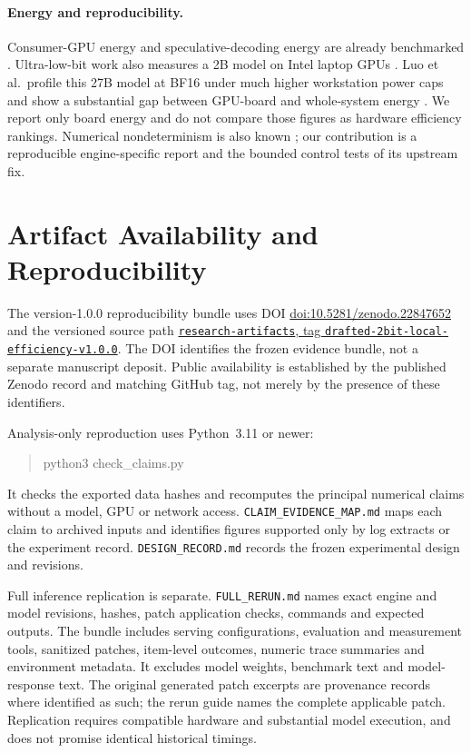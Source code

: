 \documentclass[11pt]{article}
\newcommand{\q}[1]{\texttt{#1}}
\newcommand{\paperdoi}{10.5281/zenodo.22847652}
\begin{document}
\paragraph{Energy and reproducibility.}
Consumer-GPU energy and speculative-decoding energy are already benchmarked
\citep{zahl2026energy,dutta2026specenergy}. Ultra-low-bit work also measures
a 2B model on Intel laptop GPUs \citep{georganas2025ultralow}. Luo et al.\
profile this 27B model at BF16 under much higher workstation power caps and
show a substantial gap between GPU-board and whole-system energy
\citep{luo2026energy}. We report only board energy and do not compare those
figures as hardware efficiency rankings. Numerical nondeterminism is also
known \citep{yuan2025nondeterminism}; our contribution is a reproducible
engine-specific report and the bounded control tests of its upstream fix.

\section{Artifact Availability and Reproducibility}
\label{sec:repro}

The version-1.0.0 reproducibility bundle uses DOI
\href{https://doi.org/\paperdoi}{doi:\paperdoi} and the versioned
source path \href{https://github.com/matthematics1137/research-artifacts/tree/drafted-2bit-local-efficiency-v1.0.0/papers/2026-drafted-2bit-local-efficiency}{\q{research-artifacts},
tag \q{drafted-2bit-local-efficiency-v1.0.0}}. The DOI identifies the frozen
evidence bundle, not a separate manuscript deposit. Public availability is
established by the published Zenodo record and matching GitHub tag, not
merely by the presence of these identifiers.

Analysis-only reproduction uses Python~3.11 or newer:
\begin{quote}\ttfamily
python3 check\_claims.py
\end{quote}
It checks the exported data hashes and recomputes the principal numerical
claims without a model, GPU or network access.
\q{CLAIM\_EVIDENCE\_MAP.md} maps each claim to archived inputs and identifies
figures supported only by log extracts or the experiment record.
\q{DESIGN\_RECORD.md} records the frozen experimental design and revisions.

Full inference replication is separate. \q{FULL\_RERUN.md} names exact
engine and model revisions, hashes, patch application checks, commands and
expected outputs. The bundle includes serving configurations, evaluation
and measurement tools, sanitized patches, item-level outcomes, numeric
trace summaries and environment metadata. It excludes model weights,
benchmark text and model-response text. The original generated patch
excerpts are provenance records where identified as such; the rerun guide
names the complete applicable patch. Replication requires compatible
hardware and substantial model execution, and does not promise identical
historical timings.
\end{document}
